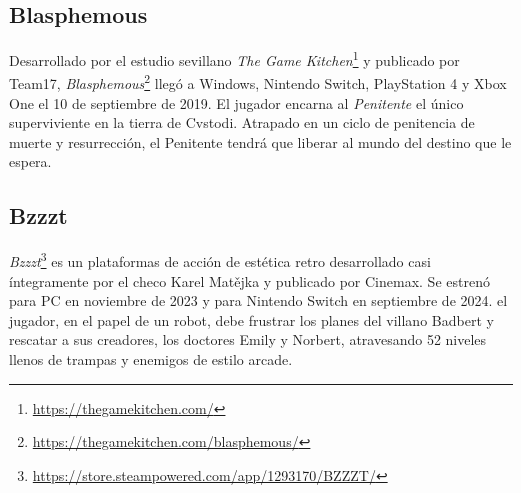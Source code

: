 \subsection{Blasphemous}
Desarrollado por el estudio sevillano \emph{The Game Kitchen}\footnote{\url{https://thegamekitchen.com/}} y publicado por Team17, \textit{Blasphemous}\footnote{\url{https://thegamekitchen.com/blasphemous/}} llegó a Windows, Nintendo Switch, PlayStation 4 y Xbox One el 10 de septiembre de 2019. El jugador encarna al \textit{Penitente} el único superviviente en la tierra de Cvstodi. Atrapado en un ciclo de penitencia de muerte y resurrección, el Penitente tendrá que liberar al mundo del destino que le espera.

\subsection{Bzzzt}

\textit{Bzzzt}\footnote{\url{https://store.steampowered.com/app/1293170/BZZZT/}} es un plataformas de acción de estética retro desarrollado casi íntegramente por el checo Karel Matějka  y publicado por Cinemax. Se estrenó para PC en noviembre de 2023 y para Nintendo Switch en septiembre de 2024. el jugador, en el papel de un robot, debe frustrar los planes del villano Badbert y rescatar a sus creadores, los doctores Emily y Norbert, atravesando 52 niveles llenos de trampas y enemigos de estilo arcade.

